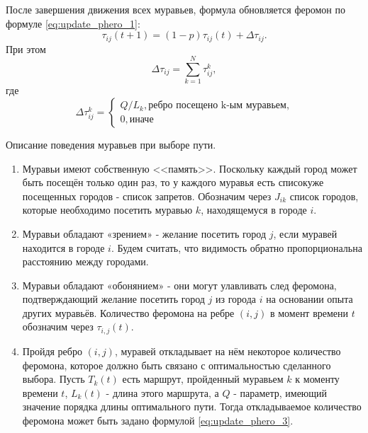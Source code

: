 После завершения движения всех муравьев, формула обновляется феромон по формуле \ref{eq:update_phero_1}:
\begin{equation}
	\label{eq:update_phero_1}
		\tau_{ij}(t+1) = (1-p)\tau_{ij}(t) + \Delta \tau_{ij}.
\end{equation}
При этом
\begin{equation}
\label{update_phero_2}
 \Delta \tau_{ij} = \sum_{k=1}^N \tau^k_{ij},
\end{equation}
где
\begin{equation}
	\label{eq:update_phero_3}
		 \Delta\tau^k_{ij} = \begin{cases}
		Q/L_{k}, \textrm{ребро посещено k-ым муравьем,} \\
		0, \textrm{иначе}
	\end{cases}
\end{equation}


Описание поведения муравьев при выборе пути.

\begin{enumerate}
	\item  Муравьи имеют собственную <<память>>. Поскольку каждый город может быть посещён только один раз, то у каждого муравья есть списокуже посещенных городов - список запретов. Обозначим через $J_{ik}$ список городов, которые необходимо посетить муравью $k$, находящемуся в городе $i$.
	\item Муравьи обладают «зрением» - желание посетить город $j$, если муравей находится в городе $i$. Будем считать, что видимость обратно пропорциональна расстоянию между городами.
	\item Муравьи обладают «обонянием» - они могут улавливать след феромона, подтверждающий желание посетить город $j$ из города $i$ на основании опыта других муравьёв. Количество феромона на ребре $(i, j)$ в момент времени $t$ обозначим через $\tau_{i,j}(t)$.
	\item Пройдя ребро $(i, j)$, муравей откладывает на нём некоторое количество феромона, которое должно быть связано с оптимальностью сделанного выбора. Пусть $T_{k}(t)$ есть маршрут, пройденный муравьем $k$ к моменту времени $t$, $L_{k}(t)$ - длина этого маршрута, а $Q$ - параметр, имеющий значение порядка длины оптимального пути. Тогда откладываемое количество феромона может быть задано формулой \ref{eq:update_phero_3}.
\end{enumerate}

